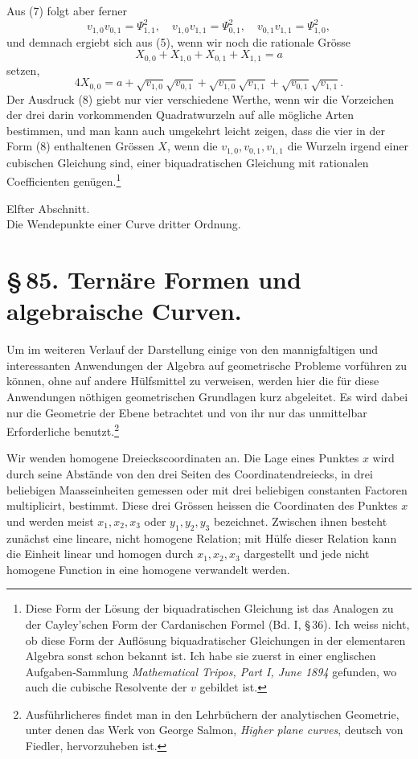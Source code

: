 \documentclass[11pt]{article}
\begin{document}
Aus (7) folgt aber ferner
\[
 v_{1,0}v_{0,1}=\Psi_{1,1}^2,
 \quad v_{1,0}v_{1,1}=\Psi_{0,1}^2,
 \quad v_{0,1}v_{1,1}=\Psi_{1,0}^2,
\]
und demnach ergiebt sich aus (5), wenn wir noch die rationale Grösse
\[
 X_{0,0}+X_{1,0}+X_{0,1}+X_{1,1}=a
\]
setzen,
\begin{equation}
 4X_{0,0}=a+\sqrt{v_{1,0}}\sqrt{v_{0,1}}
       +\sqrt{v_{1,0}}\sqrt{v_{1,1}}
       +\sqrt{v_{0,1}}\sqrt{v_{1,1}}.
 \tag{8}
\end{equation}
Der Ausdruck (8) giebt nur vier verschiedene Werthe, wenn wir die Vorzeichen der drei darin vorkommenden Quadratwurzeln auf alle mögliche Arten bestimmen, und man kann auch umgekehrt leicht zeigen, dass die vier in der Form (8) enthaltenen Grössen $X$, wenn die $v_{1,0},v_{0,1},v_{1,1}$ die Wurzeln irgend einer cubischen Gleichung sind, einer biquadratischen Gleichung mit rationalen Coefficienten genügen.\footnote{Diese Form der Lösung der biquadratischen Gleichung ist das Analogen zu der Cayley'schen Form der Cardanischen Formel (Bd. I, \S\,36). Ich weiss nicht, ob diese Form der Auflösung biquadratischer Gleichungen in der elementaren Algebra sonst schon bekannt ist. Ich habe sie zuerst in einer englischen Aufgaben-Sammlung \emph{Mathematical Tripos, Part I, June 1894} gefunden, wo auch die cubische Resolvente der $v$ gebildet ist.}


\begin{center}
{\large Elfter Abschnitt.}\\[0.4em]
{\large Die Wendepunkte einer Curve dritter Ordnung.}
\end{center}

\section*{\S\,85. Ternäre Formen und algebraische Curven.}

Um im weiteren Verlauf der Darstellung einige von den mannigfaltigen und interessanten Anwendungen der Algebra auf geometrische Probleme vorführen zu können, ohne auf andere Hülfsmittel zu verweisen, werden hier die für diese Anwendungen nöthigen geometrischen Grundlagen kurz abgeleitet. Es wird dabei nur die Geometrie der Ebene betrachtet und von ihr nur das unmittelbar Erforderliche benutzt.\footnote{Ausführlicheres findet man in den Lehrbüchern der analytischen Geometrie, unter denen das Werk von George Salmon, \emph{Higher plane curves}, deutsch von Fiedler, hervorzuheben ist.}

Wir wenden homogene Dreieckscoordinaten an. Die Lage eines Punktes $x$ wird durch seine Abstände von den drei Seiten des Coordinatendreiecks, in drei beliebigen Maasseinheiten gemessen oder mit drei beliebigen constanten Factoren multiplicirt, bestimmt. Diese drei Grössen heissen die Coordinaten des Punktes $x$ und werden meist $x_1,x_2,x_3$ oder $y_1,y_2,y_3$ bezeichnet. Zwischen ihnen besteht zunächst eine lineare, nicht homogene Relation; mit Hülfe dieser Relation kann die Einheit linear und homogen durch $x_1,x_2,x_3$ dargestellt und jede nicht homogene Function in eine homogene verwandelt werden.
\end{document}
